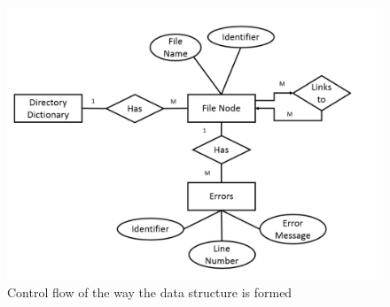 \documentclass[letterpaper,10pt,titlepage,draftclsnofoot,onecolumn,onesided] {IEEEtran}
\begin{document}
\begin{figure}[h]
	\centering
	\includegraphics[width=.75\textwidth]{InformationERDEPS-eps-converted-to}
	\caption{Control flow of the way the data structure is formed}
\end{figure}
\end{document}
